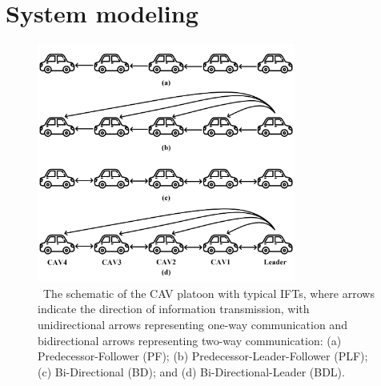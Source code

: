 \documentclass[journal]{IEEEtran}
\begin{document}





\section{System modeling}
\label{Section 3}

\begin{figure}
  \centering

  \includegraphics[width=8.5cm]{figs/fig1.png}
  \caption{~The schematic of the CAV platoon with typical IFTs, where arrows indicate the direction of information transmission, with unidirectional arrows representing one-way communication and bidirectional arrows representing two-way communication: (a) Predecessor-Follower (PF); (b) Predecessor-Leader-Follower (PLF); (c) Bi-Directional (BD); and (d) Bi-Directional-Leader (BDL).}
  \label{fig1}
\end{figure}
\end{document}
